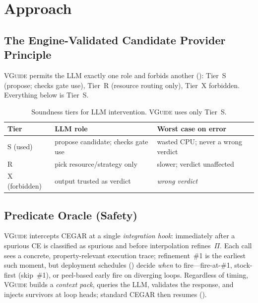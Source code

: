 \documentclass[runningheads]{llncs}
\newcommand{\tool}{\textsc{VGuide}}
\begin{document}
\section{Approach}
\label{sec:approach}

\subsection{The Engine-Validated Candidate Provider Principle}

\tool{} permits the LLM exactly one role and forbids another (): Tier~S
(propose; checks gate use), Tier~R (resource routing only), Tier~X forbidden. Everything
below is Tier~S.

\begin{table}[t]
\caption{Soundness tiers for LLM intervention. \tool{} uses only Tier~S.}
\label{tab:tiers}
\centering
\begin{tabular}{lll}
\toprule
Tier & LLM role & Worst case on error \\
\midrule
S (used) & propose candidate; checks gate use & wasted CPU; never a wrong verdict \\
R        & pick resource/strategy only         & slower; verdict unaffected \\
X (forbidden) & output trusted as verdict      & \emph{wrong verdict} \\
\bottomrule
\end{tabular}
\end{table}

\subsection{Predicate Oracle (Safety)}
\label{sec:pred}

\tool{} intercepts CEGAR at a single \emph{integration hook}: immediately after a spurious CE is
classified as spurious and before interpolation refines~$\Pi$. Each call sees a concrete,
property-relevant execution trace; refinement~\#1 is the earliest such moment, but deployment
schedules () decide \emph{when} to fire---fire-at-\#1, stock-first
(skip~\#1), or peel-based early fire on diverging loops. Regardless of timing, \tool{} builds a
\emph{context pack}, queries the LLM, validates the response,
and injects survivors at loop heads; standard CEGAR then resumes ().
\end{document}
